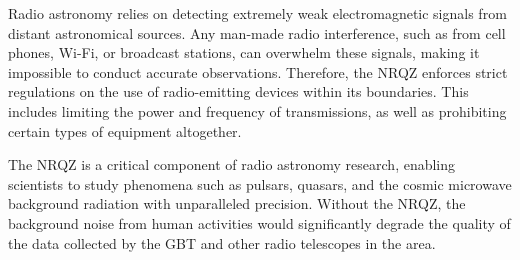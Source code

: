 Radio astronomy relies on detecting extremely weak electromagnetic signals from distant astronomical sources. Any man-made radio interference, such as from cell phones, Wi-Fi, or broadcast stations, can overwhelm these signals, making it impossible to conduct accurate observations. Therefore, the NRQZ enforces strict regulations on the use of radio-emitting devices within its boundaries. This includes limiting the power and frequency of transmissions, as well as prohibiting certain types of equipment altogether.

The NRQZ is a critical component of radio astronomy research, enabling scientists to study phenomena such as pulsars, quasars, and the cosmic microwave background radiation with unparalleled precision. Without the NRQZ, the background noise from human activities would significantly degrade the quality of the data collected by the GBT and other radio telescopes in the area.

